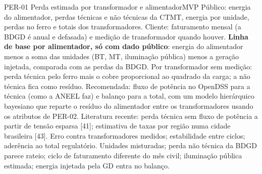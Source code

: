 \begin{ficha}{PER-01 \textperiodcentered{} Perda estimada por transformador e alimentador}{MVP}
 Público: energia do alimentador, perdas técnicas e não técnicas
da CTMT, energia por unidade, perdas no ferro e totais dos transformadores.
Cliente: faturamento mensal (a BDGD é anual e defasada) e medição de
transformador quando houver.
 \textbf{Linha de base por alimentador, só com dado
público}: energia do alimentador menos a soma das unidades (BT, MT,
iluminação pública) menos a geração injetada, comparada com as perdas da
BDGD. Por transformador sem medição: perda técnica pelo ferro mais o
cobre proporcional ao quadrado da carga; a não técnica fica como resíduo.
Recomendada: fluxo de potência no OpenDSS para a técnica (como a ANEEL faz)
e balanço para a total, com um modelo hierárquico bayesiano que reparte o
resíduo do alimentador entre os transformadores usando os atributos de
PER-02. Literatura recente: perda técnica sem fluxo de potência a partir de
tensão esparsa [41]; estimativa de taxas por região numa cidade brasileira
[43].
 Erro contra transformadores medidos; estabilidade entre
ciclos; aderência ao total regulatório.
 Unidades misturadas; perda não técnica da BDGD parece rateio;
ciclo de faturamento diferente do mês civil; iluminação pública estimada;
energia injetada pela GD entra no balanço.
\end{ficha}

